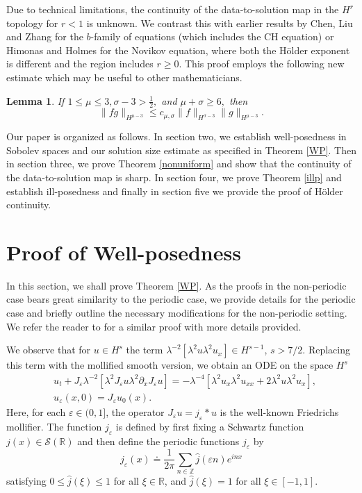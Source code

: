 \documentclass[reqno]{amsart}
\theoremstyle{plain}
\newtheorem{lemma}{Lemma}[section]
\numberwithin{equation}{section}
\newcommand{\ee}{\varepsilon}
\begin{document}
Due to technical limitations, the continuity of the data-to-solution map in the $H^r$ topology  for $  r <1$ is unknown. We contrast this with earlier results by Chen, Liu and Zhang \cite{clz} for the $b$-family of equations (which includes the CH equation) or Himonas and Holmes \cite{himonasholmes} for the Novikov equation, where both the H\"older exponent is different and the region includes $r\ge 0$.  This proof employs the following new estimate which may be useful to other mathematicians.
\begin{lemma} 
If $1 \leq \mu \leq 3, \sigma - 3 > \frac12,$ and $\mu + \sigma \geq 6,$ then 
    \[\|fg\|_{H^{\mu-3}} \leq c_{\mu,\sigma} \|f\|_{H^{\sigma-3}} \|g\|_{H^{\mu-3}}.\]
\end{lemma}


Our paper is organized as follows.  In section two, we establish well-posedness in Sobolev spaces and our solution size estimate as specified in Theorem \ref{WP}.  Then in section three, we prove Theorem \ref{nonuniform} and show that the continuity of the data-to-solution map is sharp.  In section four, we prove Theorem \ref{illp} and establish ill-posedness and finally in section five we provide the proof of H\"older continuity.




 


\section{Proof of Well-posedness}
In this section, we shall prove Theorem \ref{WP}. As the proofs in the non-periodic case bears great similarity to the periodic case, we provide details for the periodic case and briefly outline the necessary modifications for the non-periodic setting. We refer the reader to \cite{himhol} for a similar proof with more details provided. 

We observe that for $u \in H^s$ the term $\lambda^{-2} [ \lambda^2 u \lambda^2 u_x ]  \in H^{s-1}$, $s>7/2$. Replacing this term with the mollified smooth version, we obtain an ODE on the space $H^s$
\begin{align}\label{mollifiedQR}
 & u_t  +J_\ee \lambda^{-2} [ \lambda^2 J_\ee u \lambda^2\partial_x J_\ee u ] 
  = 
  - \lambda^{-4} [   \lambda^2 u_x \lambda ^2u_{xx}  + 2 
 \lambda ^2  u \lambda^2 u_x   ]  ,
 \\
\label{mollifiedQRdata}
& u_\ee(x,0) =  J_\ee u_0(x).
\end{align}
Here, for each $\ee \in (0, 1]$, the operator $J_\ee u = j_\ee * u$ is the well-known Friedrichs mollifier. The function $j_\ee$ is defined by first fixing a Schwartz function $j(x)\in\mathcal{S}(\mathbb{R})$ and then define the periodic functions $j_\ee$ by
%
\[
j_\ee(x)\doteq\frac{1}{2\pi}\sum_{n\in\mathbb{Z}}\widehat{j}(\ee n)e^{inx}
\]
%
satisfying $0\leq\widehat{j}(\xi)\leq1$ for all $\xi\in\mathbb{R}$, and $\widehat{j}(\xi)=1$ for all $\xi \in [-1,1]$.
\end{document}
